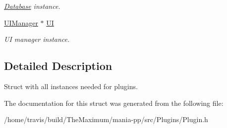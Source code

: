 \begin{DoxyCompactItemize}
\begin{DoxyCompactList}\small\item\em \hyperlink{classDatabase}{Database} instance. \end{DoxyCompactList}\item 
\hypertarget{structController_a6ff277dc9e9749bf599b240f93d413b9}{\hyperlink{classUIManager}{U\-I\-Manager} $\ast$ \hyperlink{structController_a6ff277dc9e9749bf599b240f93d413b9}{U\-I}}\label{structController_a6ff277dc9e9749bf599b240f93d413b9}

\begin{DoxyCompactList}\small\item\em U\-I manager instance. \end{DoxyCompactList}\end{DoxyCompactItemize}


\subsection{Detailed Description}
Struct with all instances needed for plugins. 

The documentation for this struct was generated from the following file\-:\begin{DoxyCompactItemize}
\item 
/home/travis/build/\-The\-Maximum/mania-\/pp/src/\-Plugins/Plugin.\-h\end{DoxyCompactItemize}
